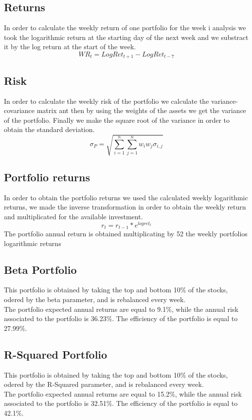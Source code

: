 \documentclass[12pt, a4paper, twocolumn]{article} %
\begin{document}
	\subsection{Returns}
	In order to calculate the weekly return of one portfolio for the week i analysis we took the logarithmic return at the starting day of the next week and we substract it by the log return at the start of the week.
	\[
		WR_t = LogRet_{t+1} - LogRet_{t-7}
	\]
	\subsection{Risk}
	In order to calculate the weekly risk of the portfolio we calculate the variance-covariance matrix ant then by using the weights of the assets we get the variance of the portfolio. Finally we make the square root of the variance in order to obtain the standard deviation.
	\[
	\sigma_P = \sqrt{\sum_{i=1}^{n}\sum_{j=1}^{n}w_i w_j \sigma_{i,j}}	
	\]
	\subsection{Portfolio returns}
	In order to obtain the portfolio returns we used the calculated weekly logarithmic returns, we made the inverse transformation in order to obtain the weekly return and multiplicated for the available investment.
	\[
	r_{t}	= r_{t-1}*e^{logret_{t}}
	\]
	The portfolio annual return is obtained multiplicating by 52 the weekly portfolios logarithmic returns
	\subsection{Beta Portfolio}
	This portfolio is obtained by taking the top and bottom 10\% of the stocks, odered by the beta parameter, and is rebalanced every week.\\
	The portfolio expected annual returns are equal to 9.1\%, while the annual risk associated to the portfolio is 36.23\%. The efficiency of the portfolio is equal to 27.99\%.
	\subsection{R-Squared Portfolio}
	This portfolio is obtained by taking the top and bottom 10\% of the stocks, odered by the R-Squared parameter, and is rebalanced every week.\\
	The portfolio expected annual returns are equal to 15.2\%, while the annual risk associated to the portfolio is 32.51\%. The efficiency of the portfolio is equal to 42.1\%.
\end{document}
